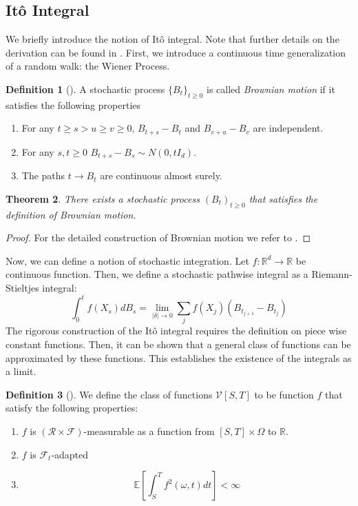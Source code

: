 \documentclass[12pt]{article}
\newtheorem{theorem}{Theorem}[section]
\theoremstyle{definition}
\newtheorem{definition}[theorem]{Definition}
\numberwithin{equation}{section}
\newcommand{\R}{\mathbb{R}}
\newcommand{\E}{\mathbb{E}}
\newcommand{\CF}{\mathcal{F}}
\newcommand{\CR}{\mathcal{R}}
\newcommand{\CV}{\mathcal{V}}
\begin{document}
\subsection{Itô Integral}
\label{subsec:ItoIntegral}
We briefly introduce the notion of Itô integral. Note that further details on the derivation can be found in \autocite{eAppliedStochasticAnalysis2021}. 
First, we introduce a continuous time generalization of a random walk: the Wiener Process.
\begin{definition}[\autocite{durrettProbabilityTheoryExamples2019}]
  A stochastic process $\{B_t\}_{t \geq 0}$ is called \emph{Brownian motion} if it satisfies the following properties
  \begin{enumerate}
    \item For any $t \geq s > u \geq v \geq 0$, $B_{t+s} - B_t$ and $B_{v+u} - B_v$ are independent.
    \item For any $s,t \geq 0$ $B_{t+s} - B_s \sim N(0, tI_d)$.
    \item The paths $t \rightarrow B_t$ are continuous almost surely.
  \end{enumerate}
\end{definition}
\begin{theorem}
  There exists a stochastic process $(B_t)_{t \geq 0}$ that satisfies the definition of Brownian motion.
\end{theorem}
\begin{proof}
  For the detailed construction of Brownian motion we refer to \autocite{durrettProbabilityTheoryExamples2019}.
\end{proof}
Now, we can define a notion of stochastic integration. Let $f : \R^d \rightarrow \R$ be continuous function. Then, we define a stochastic pathwise integral as a Riemann-Stieltjes integral:
\begin{equation*}
  \int_0^t f(X_s) dB_s = \lim\limits_{|\delta| \rightarrow 0} \sum_j f(X_j)(B_{t_{j+1}} - B_{t_j})
\end{equation*}
The rigorous construction of the Itô integral requires the definition on piece wise constant functions. Then, it can be shown that a general class of functions can be approximated by these functions. This establishes the existence of the integrals as a limit.
\begin{definition}[]
  We define the class of functions $\CV[S,T]$ to be function $f$ that satisfy the following properties:
  \begin{enumerate}
    \item $f$ is $(\CR \times \CF)$-measurable as a function from $[S,T] \times \Omega$ to $\R$.
    \item $f$ is $\CF_t$-adapted
    \item 
    \begin{equation*}
      \E \left[ \int_S^T f^2(\omega,t)dt \right] < \infty
    \end{equation*}
  \end{enumerate}
\end{definition}
\end{document}
